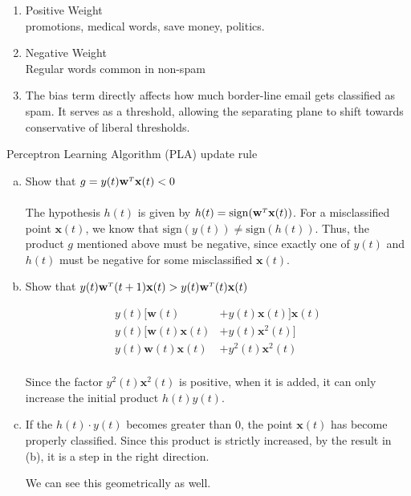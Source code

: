 \documentclass[10pt]{article}
\newenvironment{exercise}[2][Exercise]{\begin{trivlist}
\item[\hskip \labelsep {\bfseries #1}\hskip \labelsep {\bfseries #2.}]}{\end{trivlist}}
\begin{document}
\begin{enumerate}
\item Positive Weight \\
  promotions, medical words, save money, politics.
\item Negative Weight \\
  Regular words common in non-spam
\item The bias term directly affects how much border-line email gets
  classified as spam. It serves as a threshold, allowing the separating
  plane to shift towards conservative of liberal thresholds.
\end{enumerate}


\begin{exercise}{1.3}
  
  Perceptron Learning Algorithm (PLA) update rule
  \begin{enumerate}[a)]
  \item Show that $g = y(t) {\mathbf w}^{\mathsmaller T} {\mathbf x}(t) < 0$ \\ \\
    The hypothesis $h(t)$ is given by
    $h(t) = \mathrm{sign} ({\mathbf w}^{\mathsmaller T} {\mathbf
      x}(t))$.  For a misclassified point $\mathbf{x}(t)$, we know
    that $\mathrm{sign}(y(t)) \neq \mathrm{sign}(h(t))$. Thus, the
    product $g$ mentioned above must be negative, since exactly one of
    $y(t)$ and $h(t)$ must be negative for some misclassified
    $\mathbf{x}(t)$.

  \item Show that
    $ y(t) {\mathbf w}^{\mathsmaller T} (t+1) {\mathbf x}(t) > y(t)
    {\mathbf w}^{\mathsmaller T} (t) {\mathbf x}(t)$

    \begin{align*}
      y(t) \big[ \mathbf{w}(t) &+ y(t)\mathbf{x}(t)\big] \mathbf{x}(t) \\
      y(t) \big[ \mathbf{w}(t)\mathbf{x}(t) &+ y(t)\mathbf{x}^2(t)\big] \\
      y(t)\mathbf{w}(t)\mathbf{x}(t) &+ y^2(t)\mathbf{x}^2(t) \\
    \end{align*}

    Since the factor $y^2(t)\mathbf{x}^2(t)$ is positive, when it is added,
    it can only increase the initial product $h(t) y(t)$.

  \item If the $h(t) \cdot y(t)$ becomes greater than 0, the point
    $\textbf{x}(t)$ has become properly classified. Since this product
    is strictly increased, by the result in (b), it is a step in the right direction.

    We can see this geometrically as well.
  \end{enumerate}
\end{exercise}
\end{document}
